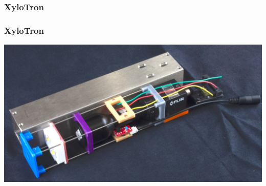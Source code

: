 \documentclass{presentation}
\begin{document}
\begin{frame}\frametitle{XyloTron}
\end{frame}

\begin{frame}\frametitle{XyloTron}
  \centering
  \includegraphics[width=\textwidth]{"./xylotron.png"}
\end{frame}
\end{document}
